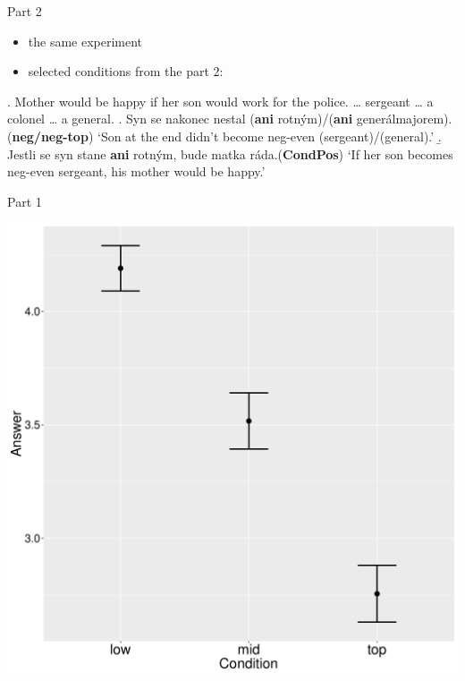 \documentclass[ignorenonframetext,]{beamer}
\providecommand{\tightlist}{%
  \setlength{\itemsep}{0pt}\setlength{\parskip}{0pt}}
\newcommand{\cond}[1]{\textbf{#1}}
\begin{document}
\begin{frame}{Part 2}

\begin{itemize}
\tightlist
\item
  the same experiment 
\item
  selected conditions from the part 2:
\end{itemize}

\ex. Mother would be happy if her son would work for the police.
\ldots{} sergeant \ldots{} a colonel \ldots{} a general.\label{ex-3} \a.
Syn se nakonec nestal (\textbf{ani} rotným)/(\textbf{ani}
generálmajorem).\hfill (\cond{neg/neg-top}) \label{ex-3-a}\newline
`Son at the end didn't become neg-even (sergeant)/(general).' \b. Jestli
se syn stane \textbf{ani} rotným, bude matka
ráda.\hfill{(\cond{CondPos})}\label{ex-2-b}\newline
`If her son becomes neg-even sergeant, his mother would be happy.'

\end{frame}


\begin{frame}{Part 1}

\begin{center}
\includegraphics[scale=0.3]{exp1-ani-part_1-errorbars.pdf}
\end{center}

\end{frame}
\end{document}

